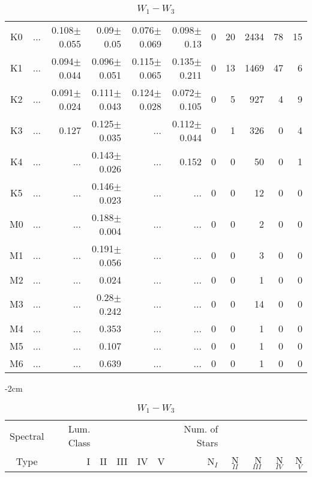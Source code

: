 \begin{table}[t]
\begin{table}[t]
\begin{center}
\begin{tabular}{c|rrrrr|rrrrr}
    K0	&	 ...	&	0.108$\pm$0.055	&	0.09$\pm$0.05	&	0.076$\pm$0.069	&	0.098$\pm$0.13	&	0	&	20	&	2434	&	78	&	15	\\
    K1	&	 ...	&	0.094$\pm$0.044	&	0.096$\pm$0.051	&	0.115$\pm$0.065	&	0.135$\pm$0.211	&	0	&	13	&	1469	&	47	&	6	\\
    K2	&	 ...	&	0.091$\pm$0.024	&	0.111$\pm$0.043	&	0.124$\pm$0.028	&	0.072$\pm$0.105	&	0	&	5	&	927	&	4	&	9	\\
    K3	&	 ...	&	0.127	&	0.125$\pm$0.035	&	 ...	&	0.112$\pm$0.044	&	0	&	1	&	326	&	0	&	4	\\
    K4	&	 ...	&	 ...	&	0.143$\pm$0.026	&	 ...	&	0.152	&	0	&	0	&	50	&	0	&	1	\\
    K5	&	 ...	&	 ...	&	0.146$\pm$0.023	&	 ...	&	 ...	&	0	&	0	&	12	&	0	&	0	\\
    M0	&	 ...	&	 ...	&	0.188$\pm$0.004	&	 ...	&	 ...	&	0	&	0	&	2	&	0	&	0	\\
    M1	&	 ...	&	 ...	&	0.191$\pm$0.056	&	 ...	&	 ...	&	0	&	0	&	3	&	0	&	0	\\
    M2	&	 ...	&	 ...	&	0.024	&	 ...	&	 ...	&	0	&	0	&	1	&	0	&	0	\\
    M3	&	 ...	&	 ...	&	0.28$\pm$0.242	&	 ...	&	 ...	&	0	&	0	&	14	&	0	&	0	\\
    M4	&	 ...	&	 ...	&	0.353	&	 ...	&	 ...	&	0	&	0	&	1	&	0	&	0	\\
    M5	&	 ...	&	 ...	&	0.107	&	 ...	&	 ...	&	0	&	0	&	1	&	0	&	0	\\
    M6	&	 ...	&	 ...	&	0.639	&	 ...	&	 ...	&	0	&	0	&	1	&	0	&	0	\\
        \bottomrule
        \end{tabular}
    \end{center}
    \end{table}
    
    \begin{table}[t]
    \tiny
    \centering
    \caption{$W_{1}-W_{3}$}
    \begin{center}
        \addtolength{\leftskip} {-2cm}
        \addtolength{\rightskip}{-2cm}
        \begin{tabular}{c|rrrrr|rrrrr}
        \toprule
        Spectral & Lum. Class & & & & & Num. of Stars & & & &  \\
        Type & I & II & III &  IV & V & N$_{I}$ & N$_{II}$ & N$_{III}$ & N$_{IV}$ & N$_{V}$ \\ \midrule
      

\end{tabular}
\end{center}
\end{table}
\end{table}
